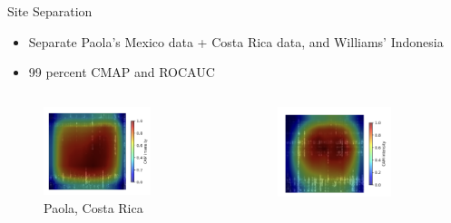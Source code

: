 \begin{frame}{Site Separation}
    \begin{itemize}
        \item Separate Paola's Mexico data + Costa Rica data, and Williams' Indonesia
        \item 99 percent CMAP and ROCAUC
    \end{itemize}
    \begin{columns}
        \begin{column}{0.25\textwidth}
            \begin{figure}
                \centering
                \includegraphics[height=0.2\textheight,width=0.75\textwidth,keepaspectratio]{images/PaolaCostaRicaNonDegraded.png}
                \caption{Paola, Costa Rica}
            \end{figure}
        \end{column}
        \begin{column}{0.25\textwidth}
            \begin{figure}
                \centering
                \includegraphics[height=0.2\textheight,width=0.75\textwidth,keepaspectratio]{images/PaolaMexicoNonDegraded.png}

\end{figure}
\end{column}
\end{columns}
\end{frame}
